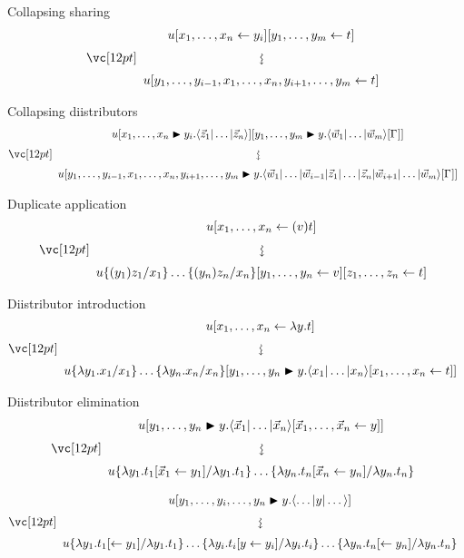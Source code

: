 \documentclass{amsart}
\begin{document}
\bigskip
\bigskip
\bigskip

\noindent
Collapsing sharing
\[
\displayrewrite
{ u\share x{y_i}\share[m] yt }
{ u\share* {y_1, \dotsc, y_{i-1}, \vv x, y_{i+1}, \dotsc, y_m}t }
\]

\bigskip
\bigskip
\bigskip

\noindent
Collapsing diistributors
\[
\displayrewrite
  { u\diistr x{y_i}{\ttup*z}\diistr[m]yy{\ttup*[m]w\G} }
  { u\diistr*{y_1,\dotsc,y_{i-1},\vv x, y_{i+1}, \dotsc, y_m} y {
  \tup*{\vv*w_1|\dotso|\vv*w_{i-1}|\vv*z_1|\dotso|\vv*z_n|\vv*w_{i+1}|\dotso|\vv*w_m}
  \G} }
\]

\bigskip
\bigskip
\bigskip

\noindent
Duplicate application
\[
\displayrewrite
{ u\share x{(v)t} }
{ u\subsapp xyz\share yv\share zt }
\]

\bigskip
\bigskip
\bigskip

\noindent
Diistributor introduction
\[
\displayrewrite
  { u\share x{\lambda y.t} }
  { u\subsabs xyx\diistr yy{\ttup x\share xt} }
\]

\bigskip
\bigskip
\bigskip

\noindent
Diistributor elimination
\[
\displayrewrite
  { u\diistr yy{\ttup*x\share{\vv*x}y} }
  { u\sub{\lambda y_1.t_1}{\lambda y_1.t_1\share*{\vv*x_1}{y_1}} \dotso
     \sub{\lambda y_n.t_n}{\lambda y_n.t_n\share*{\vv*x_n}{y_n}} }
\]

\bigskip

\[
\displayrewrite
  { u\diistr*{y_1,\dotsc,y_i,\dotsc,y_n}y{\tup*{\dotso|y|\dotso}} }
  { u\sub{\lambda y_1.t_1}{\lambda y_1.t_1\share*{}{y_1}} \dotso
     \sub{\lambda y_i.t_i}{\lambda y_i.t_i\share*{y}{y_i}} \dotso
     \sub{\lambda y_n.t_n}{\lambda y_n.t_n\share*{}{y_n}} }
\]
\end{document}
